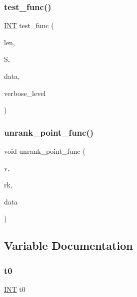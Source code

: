 \subsubsection{\texorpdfstring{test\+\_\+func()}{test\_func()}}
{\footnotesize\ttfamily \mbox{\hyperlink{galois_8h_a09fddde158a3a20bd2dcadb609de11dc}{I\+NT}} test\+\_\+func (\begin{DoxyParamCaption}\item[{\mbox{\hyperlink{galois_8h_a09fddde158a3a20bd2dcadb609de11dc}{I\+NT}}}]{len,  }\item[{\mbox{\hyperlink{galois_8h_a09fddde158a3a20bd2dcadb609de11dc}{I\+NT}} $\ast$}]{S,  }\item[{void $\ast$}]{data,  }\item[{\mbox{\hyperlink{galois_8h_a09fddde158a3a20bd2dcadb609de11dc}{I\+NT}}}]{verbose\+\_\+level }\end{DoxyParamCaption})}

\mbox{\label{factor__space_8_c_abd21d625531240a625f45cb16f06c198}} 
\subsubsection{\texorpdfstring{unrank\+\_\+point\+\_\+func()}{unrank\_point\_func()}}
{\footnotesize\ttfamily void unrank\+\_\+point\+\_\+func (\begin{DoxyParamCaption}\item[{\mbox{\hyperlink{galois_8h_a09fddde158a3a20bd2dcadb609de11dc}{I\+NT}} $\ast$}]{v,  }\item[{\mbox{\hyperlink{galois_8h_a09fddde158a3a20bd2dcadb609de11dc}{I\+NT}}}]{rk,  }\item[{void $\ast$}]{data }\end{DoxyParamCaption})}



\subsection{Variable Documentation}
\mbox{\label{factor__space_8_c_a4268f4fe222ffb119218a0199f5e1904}} 
\subsubsection{\texorpdfstring{t0}{t0}}
{\footnotesize\ttfamily \mbox{\hyperlink{galois_8h_a09fddde158a3a20bd2dcadb609de11dc}{I\+NT}} t0}

